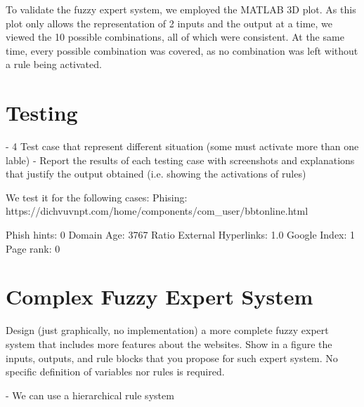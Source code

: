 \documentclass[11pt]{article}
\begin{document}
To validate the fuzzy expert system, we employed the MATLAB 3D plot. As this plot only allows the representation of 2 inputs and the output at a time, we viewed the 10 possible combinations, all of which were consistent. At the same time, every possible combination was covered, as no combination was left without a rule being activated.

\section{Testing}
- 4 Test case that represent different situation (some must activate more than one lable)
- Report the results of each testing case with 
screenshots  and  explanations  that  justify the output  obtained  (i.e.  showing  the  activations of  
rules)

We test it for the following cases:
Phising: 
https://dichvuvnpt.com/home/components/com_user/bbtonline.html

Phish hints: 0
Domain Age: 3767
Ratio External Hyperlinks: 1.0
Google Index: 1
Page rank: 0

\section{Complex Fuzzy Expert System}
Design (just graphically, no implementation) a more complete fuzzy expert system that 
includes more features about the websites. Show in a figure the inputs, outputs, and rule blocks 
that you propose for such expert system. No specific definition of variables nor rules is required. 

- We can use a hierarchical rule system

\newpage
\printbibliography
\end{document}
